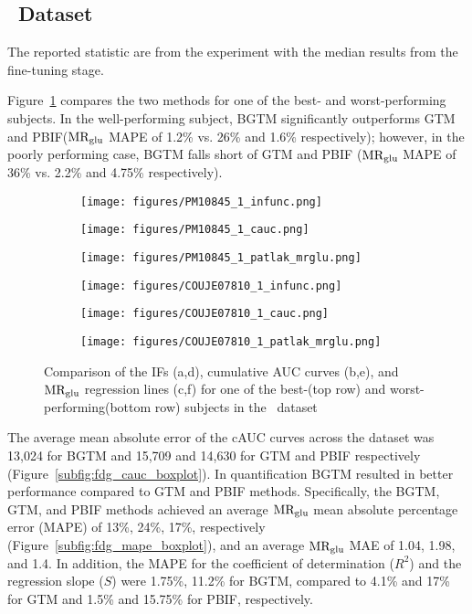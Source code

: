 \subsection{\fdg\ Dataset}
The reported statistic are from the experiment with the median results from the fine-tuning stage.

Figure~\ref{fig:fdg_ifs} compares the two methods for one of the best- and worst-performing subjects.
In the well-performing subject, BGTM significantly outperforms GTM and PBIF($\text{MR}_{\text{glu}}$ MAPE of 1.2\% vs. 26\% and 1.6\% respectively); however, in the poorly performing case, BGTM falls short of GTM and PBIF ($\text{MR}_{\text{glu}}$ MAPE of 36\% vs. 2.2\% and 4.75\% respectively).

\begin{figure}[h]
	\centering
	\begin{subfigure}[b]{0.322\textwidth}
		\texttt{[image: figures/PM10845\_1\_infunc.png]}
		\caption{}
	\end{subfigure}
	\begin{subfigure}[b]{0.322\textwidth}
		\texttt{[image: figures/PM10845\_1\_cauc.png]}
		\caption{}
	\end{subfigure}
	\begin{subfigure}[b]{0.322\textwidth}
		\texttt{[image: figures/PM10845\_1\_patlak\_mrglu.png]}
		\caption{}
	\end{subfigure}
	\begin{subfigure}[b]{0.322\textwidth}
		\texttt{[image: figures/COUJE07810\_1\_infunc.png]}
		\caption{}
	\end{subfigure}
	\begin{subfigure}[b]{0.322\textwidth}
		\texttt{[image: figures/COUJE07810\_1\_cauc.png]}
		\caption{}
	\end{subfigure}
	\begin{subfigure}[b]{0.322\textwidth}
		\texttt{[image: figures/COUJE07810\_1\_patlak\_mrglu.png]}
		\caption{}
	\end{subfigure}
	\caption{Comparison of the IFs (a,d), cumulative AUC curves (b,e), and $\text{MR}_{\text{glu}}$ regression lines (c,f) for one of the best-(top row) and worst-performing(bottom row) subjects in the \fdg\ dataset}
	\label{fig:fdg_ifs}
\end{figure}

The average mean absolute error of the cAUC curves across the dataset was 13,024 for BGTM and 15,709 and 14,630 for GTM and PBIF respectively (Figure~\ref{subfig:fdg_cauc_boxplot}).
In quantification BGTM resulted in better performance compared to GTM and PBIF methods.
Specifically, the BGTM, GTM, and PBIF methods achieved an average \(\text{MR}_{\text{glu}}\) mean absolute percentage error (MAPE) of 13\%, 24\%, 17\%, respectively (Figure~\ref{subfig:fdg_mape_boxplot}), and an average \(\text{MR}_{\text{glu}}\) MAE of 1.04, 1.98, and 1.4.
In addition, the MAPE for the coefficient of determination (\(R^2\)) and the regression slope (\(S\)) were 1.75\%, 11.2\% for BGTM, compared to 4.1\% and 17\% for GTM and 1.5\% and 15.75\% for PBIF, respectively.

